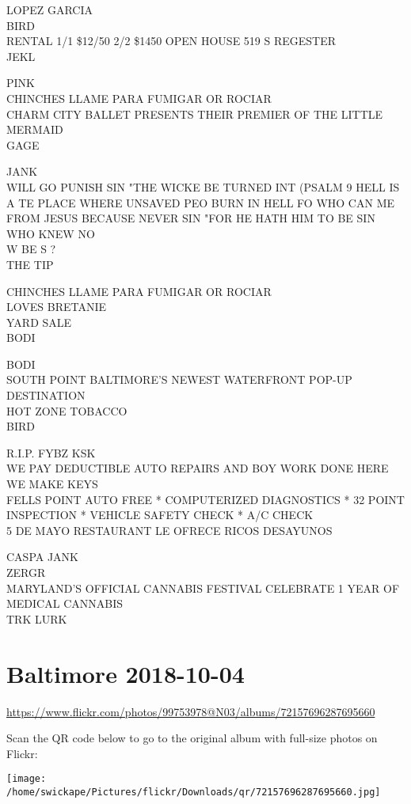 \documentclass[10pt,letterpaper]{article}
\begin{document}
LOPEZ GARCIA\\
BIRD\\
RENTAL 1/1 \$12/50 2/2 \$1450 OPEN HOUSE 519 S REGESTER\\
JEKL

PINK\\
CHINCHES LLAME PARA FUMIGAR OR ROCIAR\\
CHARM CITY BALLET PRESENTS THEIR PREMIER OF THE LITTLE MERMAID\\
GAGE

JANK\\
WILL GO PUNISH SIN "THE WICKE BE TURNED INT (PSALM 9 HELL IS A TE PLACE WHERE UNSAVED PEO BURN IN HELL FO WHO CAN ME FROM JESUS BECAUSE NEVER SIN "FOR HE HATH HIM TO BE SIN WHO KNEW NO\\
W BE S ?\\
THE TIP

CHINCHES LLAME PARA FUMIGAR OR ROCIAR\\
LOVES BRETANIE\\
YARD SALE\\
BODI

BODI\\
SOUTH POINT BALTIMORE'S NEWEST WATERFRONT POP{-}UP DESTINATION\\
HOT ZONE TOBACCO\\
BIRD

R.I.P. FYBZ KSK\\
WE PAY DEDUCTIBLE AUTO REPAIRS AND BOY WORK DONE HERE WE MAKE KEYS\\
FELLS POINT AUTO FREE * COMPUTERIZED DIAGNOSTICS * 32 POINT INSPECTION * VEHICLE SAFETY CHECK * A/C CHECK\\
5 DE MAYO RESTAURANT LE OFRECE RICOS DESAYUNOS

CASPA JANK\\
ZERGR\\
MARYLAND'S OFFICIAL CANNABIS FESTIVAL CELEBRATE 1 YEAR OF MEDICAL CANNABIS\\
TRK LURK
\pagebreak

\section*{Baltimore 2018-10-04}

\url{https://www.flickr.com/photos/99753978@N03/albums/72157696287695660}

Scan the QR code below to go to the original album with full-size photos on Flickr:

\texttt{[image: /home/swickape/Pictures/flickr/Downloads/qr/72157696287695660.jpg]}
\pagebreak
\end{document}
